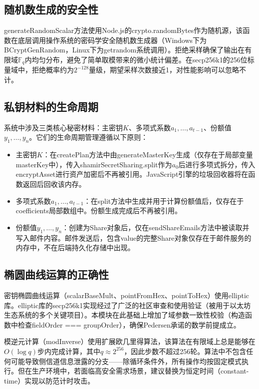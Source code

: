 \documentclass[UTF8,a4paper,zihao=-4,openany]{ctexrep}
\begin{document}
\subsection{随机数生成的安全性}

generateRandomScalar方法使用Node.js的crypto.randomBytes作为随机源，该函数在底层调用操作系统的密码学安全随机数生成器（Windows下为BCryptGenRandom，Linux下为getrandom系统调用）。拒绝采样确保了输出在有限域$\mathbb{F}_q$内均匀分布，避免了简单取模带来的微小统计偏差。在secp256k1的256位标量域中，拒绝概率约为$2^{-128}$量级，期望采样次数接近1，对性能影响可以忽略不计。

\subsection{私钥材料的生命周期}

系统中涉及三类核心秘密材料：主密钥$K$、多项式系数$a_1,\dots,a_{t-1}$、份额值$y_1,\dots,y_n$。它们的生命周期管理遵循以下原则：

\begin{itemize}
  \item 主密钥$K$：在createPlan方法中由generateMasterKey生成（仅存在于局部变量masterKey中），传入shamirSecretSharing.split作为$a_0$后进行多项式拆分，传入encryptAsset进行资产加密后不再被引用。JavaScript引擎的垃圾回收器将在函数返回后回收该内存。
  \item 多项式系数$a_1,\dots,a_{t-1}$：在split方法中生成并用于计算份额值后，仅存在于coefficients局部数组中。份额生成完成后不再被引用。
  \item 份额值$y_1,\dots,y_n$：创建为Share对象后，仅在sendShareEmails方法中被读取并写入邮件内容。邮件发送后，包含value的完整Share对象仅存在于邮件服务的内存中，不在后端持久化存储中出现。
\end{itemize}

\subsection{椭圆曲线运算的正确性}

密钥椭圆曲线运算（scalarBaseMult、pointFromHex、pointToHex）使用elliptic库。elliptic库的secp256k1实现经过了广泛的社区审查和使用验证（被用于以太坊生态系统的多个关键项目）。本模块在此基础上增加了域参数一致性校验（构造函数中检查fieldOrder === groupOrder），确保Pedersen承诺的数学前提成立。

模逆元计算（modInverse）使用扩展欧几里得算法，该算法在有限域上总是能够在$O(\log q)$步内完成计算，其中$q \approx 2^{256}$，因此步数不超过256轮。算法中不包含任何可能导致侧信道信息泄露的分支——除循环条件外，所有操作均按固定模式执行。但在生产环境中，若面临高安全需求场景，建议替换为恒定时间（constant-time）实现以防范计时攻击。
\end{document}

